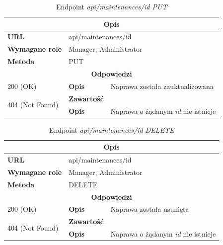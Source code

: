 \documentclass[eng,printmode,openany]{mgr}
\begin{document}
	\begin{table}[H]
		\caption{Endpoint \textit{api/maintenances/id PUT}}
		\begin{tabularx}{\textwidth}{|l|l|X|}
			\hline
			\multicolumn{3}{|c|}{\textbf{\textbf{Opis}}}
			\\ \hline
			\textbf{URL}                       & \multicolumn{2}{l|}{api/maintenances/id}
			\\ \hline
			\textbf{Wymagane role}             & \multicolumn{2}{l|}{Manager, Administrator}
			\\ \hline
			\textbf{Metoda}                    & \multicolumn{2}{l|}{PUT}
			\\ \hline
			\multicolumn{3}{|c|}{\textbf{Odpowiedzi}}
			\\ \hline
			200 (OK) 		                        & \textbf{Opis}      	& Naprawa została zauktualizowana
			\\ \hline
			\multirow{2}{*}{404 (Not Found)} 	    & \textbf{Zawartość}     & 
			\\ \cline{2-3}                          & \textbf{Opis}          & Naprawa o żądanym \textit{id} nie istnieje
			\\ \hline
		\end{tabularx}
	\end{table}
	
	\begin{table}[H]
		\caption{Endpoint \textit{api/maintenances/id DELETE}}
		\begin{tabularx}{\textwidth}{|l|l|X|}
			\hline
			\multicolumn{3}{|c|}{\textbf{\textbf{Opis}}}
			\\ \hline
			\textbf{URL}                       & \multicolumn{2}{l|}{api/maintenances/id}
			\\ \hline
			\textbf{Wymagane role}             & \multicolumn{2}{l|}{Manager, Administrator}
			\\ \hline
			\textbf{Metoda}                    & \multicolumn{2}{l|}{DELETE}
			\\ \hline
			\multicolumn{3}{|c|}{\textbf{Odpowiedzi}}
			\\ \hline
			200 (OK)			                & \textbf{Opis}         	& Naprawa została usunięta
			\\ \hline
			\multirow{2}{*}{404 (Not Found)} 	& \textbf{Zawartość}     & 
			\\ \cline{2-3}                      & \textbf{Opis}          & Naprawa o żądanym \textit{id} nie istnieje
			\\ \hline
		\end{tabularx}
	\end{table}
	
\end{document}
